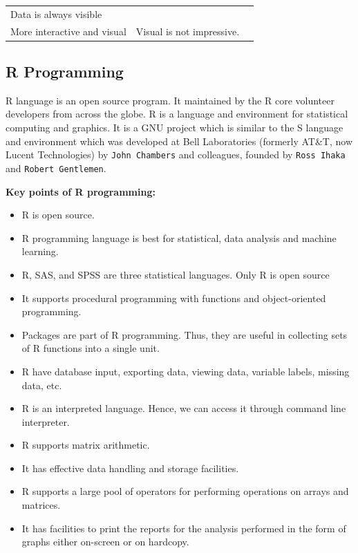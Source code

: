 \documentclass[]{book}
\providecommand{\tightlist}{%
  \setlength{\itemsep}{0pt}\setlength{\parskip}{0pt}}
\begin{document}
\begin{longtable}[]{@{}lll@{}}
\begin{minipage}[t]{0.35\columnwidth}
Data is always visible\strut
\end{minipage} & \begin{minipage}[t]{0.30\columnwidth}\raggedright\strut
\strut
\end{minipage}\tabularnewline
\begin{minipage}[t]{0.26\columnwidth}\raggedright\strut
More interactive and visual\strut
\end{minipage} & \begin{minipage}[t]{0.35\columnwidth}\raggedright\strut
Visual is not impressive.\strut
\end{minipage} & \begin{minipage}[t]{0.30\columnwidth}\raggedright\strut
\strut
\end{minipage}\tabularnewline
\bottomrule
\end{longtable}

\subsection{R Programming}\label{r-programming}

R language is an open source program. It maintained by the R core
volunteer developers from across the globe. R is a language and
environment for statistical computing and graphics. It is a GNU project
which is similar to the S language and environment which was developed
at Bell Laboratories (formerly AT\&T, now Lucent Technologies) by
\texttt{John\ Chambers} and colleagues, founded by \texttt{Ross\ Ihaka}
and \texttt{Robert\ Gentlemen}.

\textbf{Key points of R programming:}

\begin{itemize}
\tightlist
\item
  R is open source.
\item
  R programming language is best for statistical, data analysis and
  machine learning.
\item
  R, SAS, and SPSS are three statistical languages. Only R is open
  source
\item
  It supports procedural programming with functions and object-oriented
  programming.
\item
  Packages are part of R programming. Thus, they are useful in
  collecting sets of R functions into a single unit.
\item
  R have database input, exporting data, viewing data, variable labels,
  missing data, etc.
\item
  R is an interpreted language. Hence, we can access it through command
  line interpreter.
\item
  R supports matrix arithmetic.
\item
  It has effective data handling and storage facilities.
\item
  R supports a large pool of operators for performing operations on
  arrays and matrices.
\item
  It has facilities to print the reports for the analysis performed in
  the form of graphs either on-screen or on hardcopy.
\end{itemize}
\end{document}
